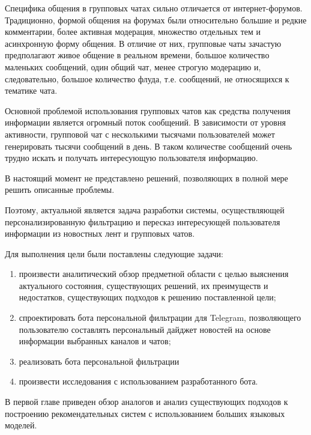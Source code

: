 Специфика общения в групповых чатах сильно отличается от интернет-форумов. Традиционно, формой общения на форумах были относительно большие и редкие комментарии, более активная модерация, множество отдельных тем и асинхронную форму общения. В отличие от них, групповые чаты зачастую предполагают живое общение в реальном времени, большое количество маленьких сообщений, один общий чат, менее строгую модерацию и, следовательно, большое количество флуда, т.е. сообщений, не относящихся к тематике чата.

Основной проблемой использования групповых чатов как средства получения информации является огромный поток сообщений. В зависимости от уровня активности, групповой чат с несколькими тысячами пользователей может генерировать тысячи сообщений в день. В таком количестве сообщений очень трудно искать и получать интересующую пользователя информацию.

В настоящий момент не представлено решений, позволяющих в полной мере решить описанные проблемы.

Поэтому, актуальной является задача разработки системы, осуществляющей персонализированную фильтрацию и пересказ интересующей пользователя информации из новостных лент и групповых чатов.

Для выполнения цели были поставлены следующие задачи:
\begin{enumerate}
    \item произвести аналитический обзор предметной области с целью выяснения актуального состояния, существующих решений, их преимуществ и недостатков, существующих подходов к решению поставленной цели;
    \item спроектировать бота персональной фильтрации для Telegram, позволяющего пользователю составлять персональный дайджет новостей на основе информации выбранных каналов и чатов;
    \item реализовать бота персональной фильтрации
    \item произвести исследования с использованием разработанного бота.
\end{enumerate}

В первой главе приведен обзор аналогов и анализ существующих подходов к построению рекомендательных систем с использованием больших языковых моделей.

